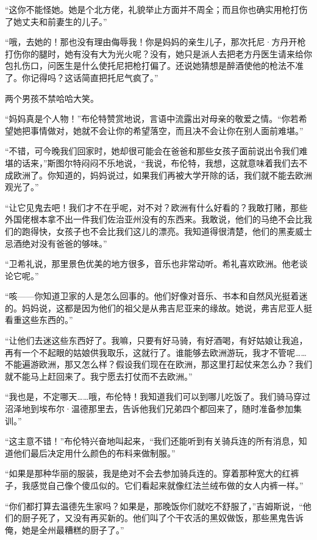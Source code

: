 \par “这你不能怪她。她是个北方佬，礼貌举止方面并不周全；而且你也确实用枪打伤了她丈夫和前妻生的儿子。”
\par “哦，去她的！那也没有理由侮辱我！你是妈妈的亲生儿子，那次托尼·方丹开枪打伤你的腿时，她有没有大为光火呢？没有，她只是派人去把老方丹医生请来给你包扎伤口，问医生是什么使托尼把枪打偏了。还说她猜想是醉酒使他的枪法不准了。你记得吗？这话简直把托尼气疯了。”
\par 两个男孩不禁哈哈大笑。
\par “妈妈真是个人物！”布伦特赞赏地说，言语中流露出对母亲的敬爱之情。“你若希望她把事情做对，她就不会让你的希望落空，而且决不会让你在别人面前难堪。”
\par “不错，可今晚我们回家时，她却很可能会在爸爸和那些女孩子面前说出令我们难堪的话来，”斯图尔特闷闷不乐地说，“我说，布伦特，我想，这就意味着我们去不成欧洲了。你知道的，妈妈说过，如果我们再被大学开除的话，我们就不能去欧洲观光了。”
\par “让它见鬼去吧！我们才不在乎呢，对不对？欧洲有什么好看的？我敢打赌，那些外国佬根本拿不出一件我们佐治亚州没有的东西来。我敢说，他们的马绝不会比我们的跑得快，女孩子也不会比我们这儿的漂亮。我知道得很清楚，他们的黑麦威士忌酒绝对没有爸爸的够味。”
\par “卫希礼说，那里景色优美的地方很多，音乐也非常动听。希礼喜欢欧洲。他老谈论它呢。”
\par “咳——你知道卫家的人是怎么回事的。他们好像对音乐、书本和自然风光挺着迷的。妈妈说，这都是因为他们的祖父是从弗吉尼亚来的缘故。她说，弗吉尼亚人挺看重这些东西的。”
\par “让他们去迷这些东西好了。我嘛，只要有好马骑，有好酒喝，有好姑娘让我追，再有一个不起眼的姑娘供我取乐，这就行了。谁能够去欧洲游玩，我才不管呢……不能遍游欧洲，那又怎么样？假设我们现在在欧洲，那这里打起仗来怎么办？我们就不能马上赶回来了。我宁愿去打仗而不去欧洲。”
\par “我也是，不定哪天……哦，布伦特！我知道我们可以到哪儿吃饭了。我们骑马穿过沼泽地到埃布尔·温德那里去，告诉他我们兄弟四个都回来了，随时准备参加集训。”
\par “这主意不错！”布伦特兴奋地叫起来，“我们还能听到有关骑兵连的所有消息，知道他们最后决定用什么颜色的布料来做制服。”
\par “如果是那种华丽的服装，我是绝对不会去参加骑兵连的。穿着那种宽大的红裤子，我感觉自己像个傻瓜似的。它们看起来就像红法兰绒布做的女人内裤一样。”
\par “你们都打算去温德先生家吗？如果是，那晚饭你们就吃不舒服了，”吉姆斯说，“他们的厨子死了，又没有再买新的。他们叫了个干农活的黑奴做饭，那些黑鬼告诉俺，她是全州最糟糕的厨子了。”
